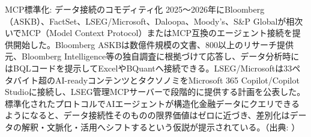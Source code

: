 \begin{casestudy}{MCP標準化: データ接続のコモディティ化}
2025〜2026年にBloomberg（ASKB）、FactSet、LSEG/Microsoft、Daloopa、Moody's、S\&P Globalが相次いでMCP（Model Context Protocol）またはMCP互換のエージェント接続を提供開始した。Bloomberg ASKBは数億件規模の文書、800以上のリサーチ提供元、Bloomberg Intelligence等の独自調査に根拠づけて応答し、データ分析時にはBQLコードを提示してExcelやBQuantへ接続できる\cite{x02bloombergai2026}。LSEG/Microsoftは33ペタバイト超のAI-readyコンテンツとタクソノミをMicrosoft 365 Copilot/Copilot Studioに接続し、LSEG管理MCPサーバーで段階的に提供する計画を公表した\cite{x02lsegmicrosoft2025}。標準化されたプロトコルでAIエージェントが構造化金融データにクエリできるようになると、データ接続性そのものの限界価値はゼロに近づき、差別化はデータの解釈・文脈化・活用へシフトするという仮説が提示されている。（出典: \cite{factset_mcp_nd,x02moodysmcp2026,x02spglobalmcp2026}）
\end{casestudy}

